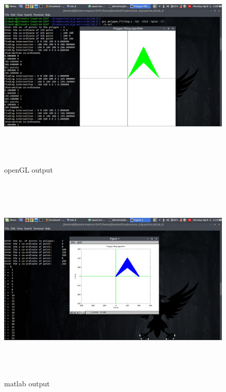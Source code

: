 \begin{figure}[ht!]
\centering
\includegraphics[width=150mm, height=100mm]{openGL.png}
\caption{openGL output \label{overflow}}
\end{figure}
\begin{figure}[ht!]
\centering
\includegraphics[width=150mm, height=100mm]{matlab.png}
\caption{matlab output \label{overflow}}
\end{figure}

